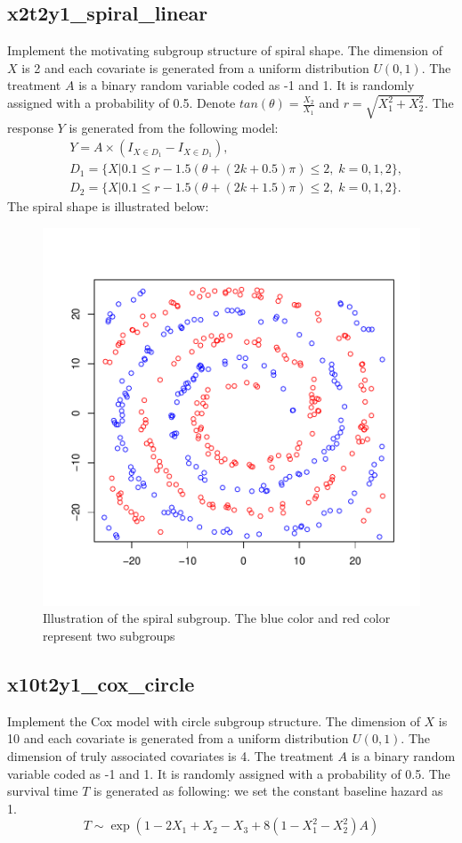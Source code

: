 \documentclass[12pt]{article}
\begin{document}
\subsection*{x2t2y1\_spiral\_linear}
Implement the motivating subgroup structure of spiral shape. The dimension of $X$ is 2 and each covariate is generated from a uniform distribution $U(0,1)$. The treatment $A$ is a binary random variable coded as -1 and 1. It is randomly assigned with a probability of 0.5.
Denote $tan(\theta) = \frac{X_2}{X_1}$ and $r = \sqrt{X_1^2+X_2^2}$.
The response $Y$ is generated from the following model: 
\begin{align*}
&Y = A\times (I_{X\in D_1}-I_{X\in D_1}) , \\
&D_1 = \big\{X|0.1\leq r - 1.5(\theta+(2k+0.5)\pi)\leq 2,\;k=0,1,2 \big\}, \\
&D_2 = \big\{X|0.1\leq r - 1.5(\theta+(2k+1.5)\pi)\leq 2,\;k=0,1,2 \big\}.
\end{align*}
The spiral shape is illustrated below:
\vspace{-5mm}
\begin{figure}[h]
	\centering
	\includegraphics[width=0.5\linewidth]{spiral}
	\vspace{-5mm}
	\caption{Illustration of the spiral subgroup. The blue color and red color represent two subgroups}
	\label{fig:spiral}
\end{figure}



\subsection*{x10t2y1\_cox\_circle}
Implement the Cox model with circle subgroup structure. The dimension of $X$ is 10 and each covariate is generated from a uniform distribution $U(0,1)$. The dimension of truly associated covariates is 4. The treatment $A$ is a binary random variable coded as -1 and 1. It is randomly assigned with a probability of 0.5. The survival time $T$ is generated as following: we set the constant baseline hazard as 1.
$$T \sim \exp(1 -2X_1 + X_2 -X_3 + 8(1-X_1^2-X_2^2)A )$$
\end{document}
